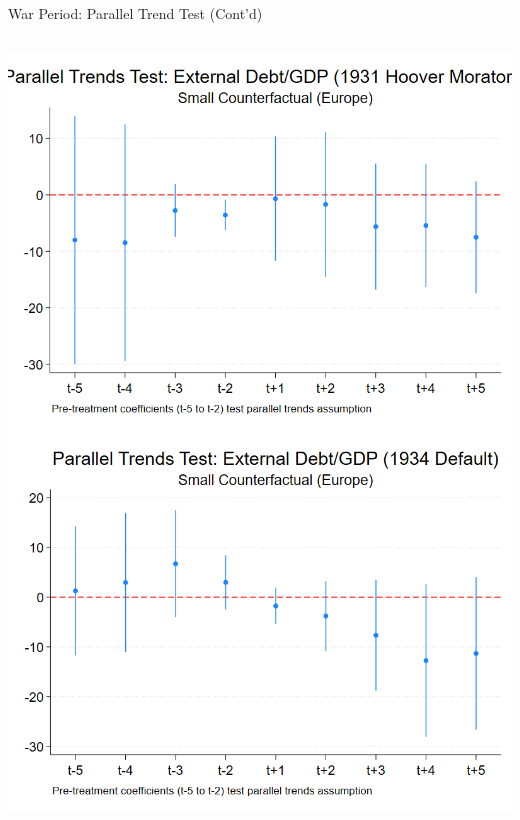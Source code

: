\documentclass{beamer}
\begin{document}
\begin{frame}{War Period: Parallel Trend Test (Cont'd)}
\begin{columns}[T]
\begin{column}{0.45\textwidth}
      \centering
      \includegraphics[width=0.9\linewidth]{figures/PT_ExtDebt_1931.png}
      \includegraphics[width=0.9\linewidth]{figures/PT_ExtDebt_1934.png}
    \end{column}
  \end{columns}
\end{frame}
\end{document}
